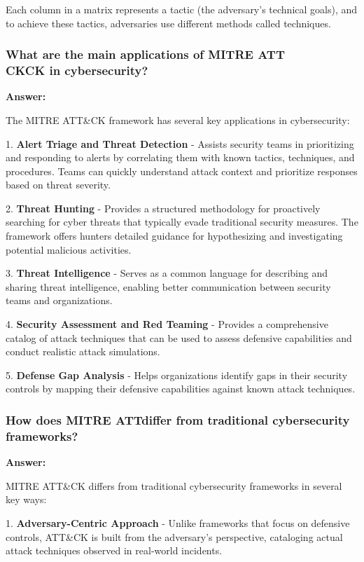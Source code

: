 \documentclass[12pt,a4paper]{article}
\begin{document}
Each column in a matrix represents a tactic (the adversary's technical goals), and to achieve these tactics, adversaries use different methods called techniques. 

\subsubsection{What are the main applications of MITRE ATT\\CKCK in cybersecurity?}

\textbf{Answer:}

The MITRE ATT\&CK framework has several key applications in cybersecurity: 

1. \textbf{Alert Triage and Threat Detection} - Assists security teams in prioritizing and responding to alerts by correlating them with known tactics, techniques, and procedures. Teams can quickly understand attack context and prioritize responses based on threat severity.

2. \textbf{Threat Hunting} - Provides a structured methodology for proactively searching for cyber threats that typically evade traditional security measures. The framework offers hunters detailed guidance for hypothesizing and investigating potential malicious activities.

3. \textbf{Threat Intelligence} - Serves as a common language for describing and sharing threat intelligence, enabling better communication between security teams and organizations.

4. \textbf{Security Assessment and Red Teaming} - Provides a comprehensive catalog of attack techniques that can be used to assess defensive capabilities and conduct realistic attack simulations.

5. \textbf{Defense Gap Analysis} - Helps organizations identify gaps in their security controls by mapping their defensive capabilities against known attack techniques. 

\subsubsection{How does MITRE ATT\CK differ from traditional cybersecurity frameworks?}

\textbf{Answer:}

MITRE ATT\&CK differs from traditional cybersecurity frameworks in several key ways:

1. \textbf{Adversary-Centric Approach} - Unlike frameworks that focus on defensive controls, ATT\&CK is built from the adversary's perspective, cataloging actual attack techniques observed in real-world incidents.
\end{document}

